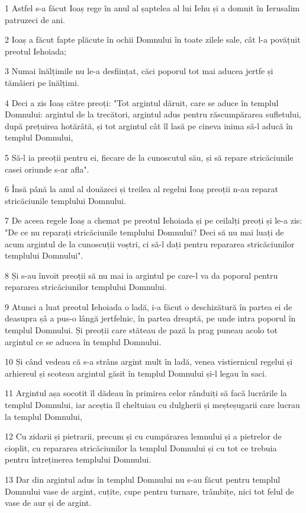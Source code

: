 \par 1 Astfel s-a făcut Ioaș rege în anul al șaptelea al lui Iehu și a domnit în Ierusalim patruzeci de ani.
\par 2 Ioaș a făcut fapte plăcute în ochii Domnului în toate zilele sale, cât l-a povățuit preotul Iehoiada;
\par 3 Numai înălțimile nu le-a desființat, căci poporul tot mai aducea jertfe și tămâieri pe înălțimi.
\par 4 Deci a zis Ioaș către preoți: "Tot argintul dăruit, care se aduce în templul Domnului: argintul de la trecători, argintul adus pentru răscumpărarea sufletului, după prețuirea hotărâtă, și tot argintul cât îl lasă pe cineva inima să-l aducă în templul Domnului,
\par 5 Să-l ia preoții pentru ei, fiecare de la cunoscutul său, și să repare stricăciunile casei oriunde s-ar afla".
\par 6 Însă până la anul al douăzeci și treilea al regelui Ioaș preoții n-au reparat stricăciunile templului Domnului.
\par 7 De aceea regele Ioaș a chemat pe preotul Iehoiada și pe ceilalți preoți și le-a zis: "De ce nu reparați stricăciunile templului Domnului? Deci să nu mai luați de acum argintul de la cunoscuții voștri, ci să-l dați pentru repararea stricăciunilor templului Domnului".
\par 8 Și s-au învoit preoții să nu mai ia argintul pe care-l va da poporul pentru repararea stricăciunilor templului Domnului.
\par 9 Atunci a luat preotul Iehoiada o ladă, i-a făcut o deschizătură în partea ei de deasupra șâ a pus-o lângă jertfelnic, în partea dreaptă, pe unde intra poporul în templul Domnului. Și preoții care stăteau de pază la prag puneau acolo tot argintul ce se aducea în templul Domnului.
\par 10 Și când vedeau că s-a strâns argint mult în ladă, venea vistiernicul regelui și arhiereul și scoteau argintul găsit în templul Domnului și-l legau în saci.
\par 11 Argintul așa socotit îl dădeau în primirea celor rânduiți să facă lucrările la templul Domnului, iar aceștia îl cheltuiau cu dulgherii și meșteșugarii care lucrau la templul Domnului,
\par 12 Cu zidarii și pietrarii, precum și cu cumpărarea lemnului și a pietrelor de cioplit, cu repararea stricăciunilor la templul Domnului și cu tot ce trebuia pentru întreținerea templului Domnului.
\par 13 Dar din argintul adus în templul Domnului nu s-au făcut pentru templul Domnului vase de argint, cuțite, cupe pentru turnare, trâmbițe, nici tot felul de vase de aur și de argint.
